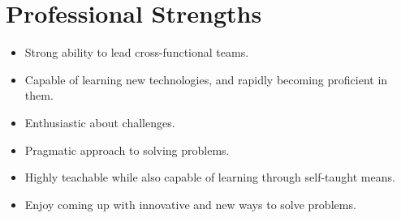 \section*{Professional Strengths}
\begin{multicols}{2}
	\begin{itemize}
		\item Strong ability to lead cross-functional teams.
		\item Capable of learning new technologies, and rapidly becoming proficient in them.
		\item Enthusiastic about challenges.
		\item Pragmatic approach to solving problems.
		\item Highly teachable while also capable of learning through self-taught means.
		\item Enjoy coming up with innovative and new ways to solve problems.
	\end{itemize}
\end{multicols}
